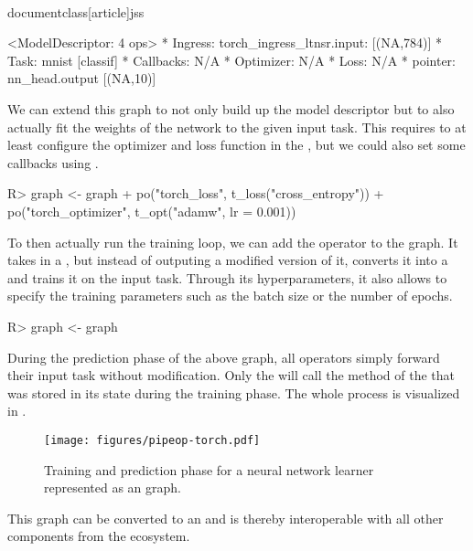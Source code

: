 \\documentclass[article]{jss}
\theoremstyle{definition}
\begin{document}
\begin{CodeOutput}
<ModelDescriptor: 4 ops>
* Ingress:  torch_ingress_ltnsr.input: [(NA,784)]
* Task:  mnist [classif]
* Callbacks:  N/A
* Optimizer:  N/A
* Loss:  N/A
* pointer:  nn_head.output [(NA,10)]
\end{CodeOutput}

We can extend this graph to not only build up the model descriptor but to also actually fit the weights of the network to the given input task.
This requires to at least configure the optimizer and loss function in the , but we could also set some callbacks using .

\begin{CodeInput}
R> graph <- graph %
+    po("torch_loss", t_loss("cross_entropy")) %
+    po("torch_optimizer", t_opt("adamw", lr = 0.001))
\end{CodeInput}

To then actually run the training loop, we can add the  operator to the graph.
It takes in a , but instead of outputing a modified version of it, converts it into a  and trains it on the input task.
Through its hyperparameters, it also allows to specify the training parameters such as the batch size or the number of epochs.

\begin{CodeInput}
R> graph <- graph %
\end{CodeInput}

During the prediction phase of the above graph, all  operators simply forward their input task without modification.
Only the  will call the  method of the  that was stored in its state during the training phase.
The whole process is visualized in .

\begin{figure}
    \centering
    \texttt{[image: figures/pipeop-torch.pdf]}
    \caption{Training and prediction phase for a neural network learner represented as an \mlrtpipelines{} graph.}
    \label{fig:pipeop-torch}
\end{figure}

This graph can be converted to an  and is thereby interoperable with all other components from the  ecosystem.
\end{document}
